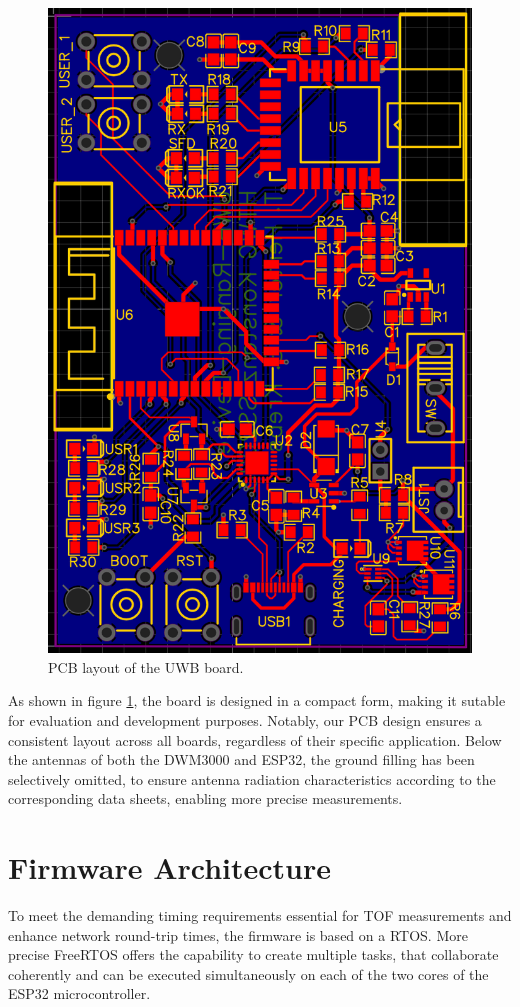 \documentclass[conference, a4paper]{IEEEtran}
\begin{document}
\begin{figure}[hbt!]
	\centering
	\includegraphics[scale=0.30]{pic/pcb_design.png}
	\caption{PCB layout of the UWB board.}
	\label{fig:pcb}
\end{figure}
As shown in figure \ref{fig:pcb}, the board is designed in a compact form,
making it sutable for evaluation and development purposes.
Notably, our PCB design ensures a consistent layout across all boards, regardless of their specific application.
Below the antennas of both the DWM3000 and ESP32, the ground filling has been selectively omitted, to ensure antenna radiation characteristics according to the corresponding data sheets, enabling more precise measurements.

\section{Firmware Architecture}\label{section:firmware}
To meet the demanding timing requirements essential for \ac{TOF} measurements and enhance network round-trip times,
the firmware is based on a \ac{RTOS}.
More precise FreeRTOS \cite{FreeRTOS_2023} offers the capability to create multiple tasks, that collaborate coherently and can be executed simultaneously on each of the two cores of the ESP32 microcontroller.
\end{document}
